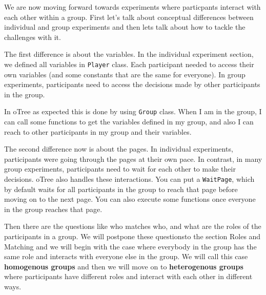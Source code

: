\documentclass[
  letterpaper,
  DIV=11,
  numbers=noendperiod]{scrreprt}
\begin{document}
We are now moving forward towards experiments where particpants interact
with each other within a group. First let's talk about conceptual
differences between individual and group experiments and then lets talk
about how to tackle the challenges with it.

The first difference is about the variables. In the individual
experiment section, we defined all variables in \texttt{Player} class.
Each participant needed to access their own variables (and some
constants that are the same for everyone). In group experiments,
participants need to access the decisions made by other participants in
the group.

In oTree as expected this is done by using \texttt{Group} class. When I
am in the group, I can call some functions to get the variables defined
in my group, and also I can reach to other participants in my group and
their variables.

The second difference now is about the pages. In individual experiments,
participants were going through the pages at their own pace. In
contrast, in many group experiments, participants need to wait for each
other to make their decisions. oTree also handles these interactions.
You can put a \texttt{WaitPage}, which by default waits for all
participants in the group to reach that page before moving on to the
next page. You can also execute some functions once everyone in the
group reaches that page.

Then there are the questions like who matches who, and what are the
roles of the participants in a group. We will postpone these questionsto
the section Roles and Matching and we will begin with the case where
everybody in the group has the same role and interacts with everyone
else in the group. We will call this case \textbf{homogenous groups} and
then we will move on to \textbf{heterogenous groups} where participants
have different roles and interact with each other in different ways.
\end{document}

